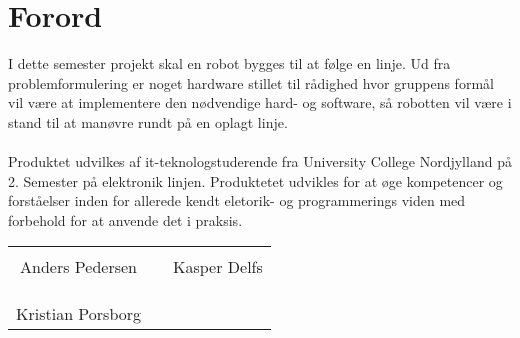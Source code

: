 \chapter*{Forord}

I dette semester projekt skal en robot bygges til at følge en linje. Ud fra problemformulering er noget hardware stillet til rådighed hvor gruppens formål vil være at implementere den nødvendige hard- og software, så 
robotten vil være i stand til at manøvre rundt på en oplagt linje. 
\\
\\
Produktet udvilkes af it-teknologstuderende fra University College Nordjylland på 2. Semester på elektronik linjen. 
Produktetet udvikles for at øge kompetencer og forståelser inden for allerede kendt eletorik- og programmerings viden med forbehold for at anvende det i praksis.





%
\phantom{Luft}\vspace{3cm}
\begin{table}[H]
	\centering
		\begin{tabular}{c c c}
			\underline{\phantom{JAERJAERJAERJAERGO}} & \phantom{cookies} & \underline{\phantom{JAERJAERJAERJAERGO}} \\
			Anders Pedersen			& \phantom{cookies} & Kasper Delfs		\\
			&&\\
			&&\\
			 \underline{\phantom{JAERJAERJAERJAERGO}} \\
			Kristian Porsborg			
			&&\\
					
		\end{tabular}
\end{table}